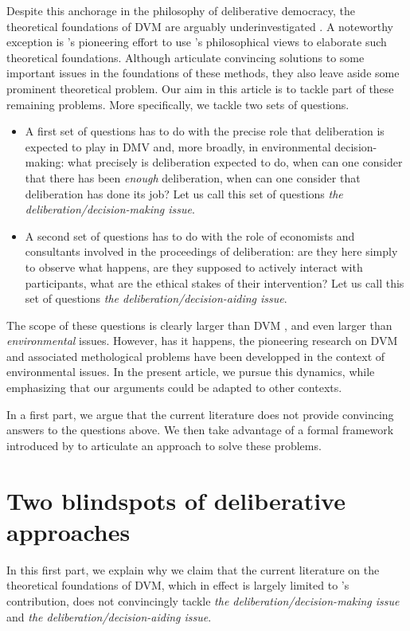 \documentclass[version=3.21, pagesize, twoside=off, bibliography=totoc, DIV=calc, fontsize=12pt, a4paper, french, english]{scrartcl}
\begin{document}
Despite this anchorage in the philosophy of deliberative democracy, the theoretical foundations of DVM are arguably underinvestigated \citep{bartkowski_economic_2017,bartkowski_beyond_2018,bunse_what_2015,kenter_what_2015}. A noteworthy exception is \citet{bartkowski_beyond_2018}'s pioneering effort to use \citet{sen_idea_2009}'s philosophical views to elaborate such theoretical foundations. Although \citet{bartkowski_beyond_2018} articulate convincing solutions to some important issues in the foundations of these methods, they also leave aside some prominent theoretical problem. Our aim in this article is to tackle part of these remaining problems. More specifically, we tackle two sets of questions.
\begin{itemize}
\item A first set of questions has to do with the precise role that deliberation is expected to play in DMV and, more broadly, in environmental decision-making: what precisely is deliberation expected to do, when can one consider that there has been \emph{enough} deliberation, when can one consider that deliberation has done its job? Let us call this set of questions \emph{the deliberation/decision-making issue}.
\item A second set of questions has to do with the role of economists and consultants involved in the proceedings of deliberation: are they here simply to observe what happens, are they supposed to actively interact with participants, what are the ethical stakes of their intervention? Let us call this set of questions \emph{the deliberation/decision-aiding issue}.
\end{itemize}
The scope of these questions is clearly larger than DVM , and even larger than \emph{environmental} issues. However, has it happens, the pioneering research on DVM and associated methological problems have been developped in the context of environmental issues. In the present article, we pursue this dynamics, while emphasizing that our arguments could be adapted to other contexts.

In a first part, we argue that the current literature does not provide convincing answers to the questions above. We then take advantage of a formal framework introduced by \citet{cailloux_formal_2018} to articulate an approach to solve these problems. 

\section{Two blindspots of deliberative approaches}
In this first part, we explain why we claim that the current literature on the theoretical foundations of DVM, which in effect is largely limited to \citet{bartkowski_beyond_2018}'s contribution, does not convincingly tackle \emph{the deliberation/decision-making issue} and \emph{the deliberation/decision-aiding issue}.
\end{document}
